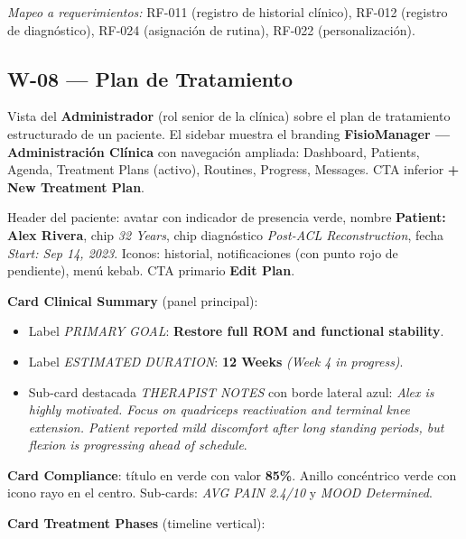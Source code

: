 \textit{Mapeo a requerimientos:} RF-011 (registro de historial clínico), RF-012 (registro de diagnóstico), RF-024 (asignación de rutina), RF-022 (personalización).


\subsection{W-08 --- Plan de Tratamiento}

Vista del \textbf{Administrador} (rol senior de la clínica) sobre el plan de tratamiento estructurado de un paciente. El sidebar muestra el branding \textbf{FisioManager --- Administración Clínica} con navegación ampliada: Dashboard, Patients, Agenda, Treatment Plans (activo), Routines, Progress, Messages. CTA inferior \textbf{+ New Treatment Plan}.

Header del paciente: avatar con indicador de presencia verde, nombre \textbf{Patient: Alex Rivera}, chip \textit{32 Years}, chip diagnóstico \textit{Post-ACL Reconstruction}, fecha \textit{Start: Sep 14, 2023}. Iconos: historial, notificaciones (con punto rojo de pendiente), menú kebab. CTA primario \textbf{Edit Plan}.

\textbf{Card Clinical Summary} (panel principal):

\begin{itemize}
  \item Label \textit{PRIMARY GOAL}: \textbf{Restore full ROM and functional stability}.
  \item Label \textit{ESTIMATED DURATION}: \textbf{12 Weeks} \textit{(Week 4 in progress)}.
  \item Sub-card destacada \textit{THERAPIST NOTES} con borde lateral azul: \textit{Alex is highly motivated. Focus on quadriceps reactivation and terminal knee extension. Patient reported mild discomfort after long standing periods, but flexion is progressing ahead of schedule}.
\end{itemize}

\textbf{Card Compliance}: título en verde con valor \textbf{85\%}. Anillo concéntrico verde con icono rayo en el centro. Sub-cards: \textit{AVG PAIN 2.4/10} y \textit{MOOD Determined}.

\textbf{Card Treatment Phases} (timeline vertical):

